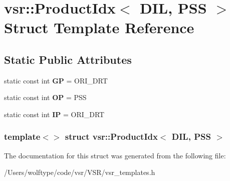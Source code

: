 \hypertarget{structvsr_1_1_product_idx_3_01_d_i_l_00_01_p_s_s_01_4}{\section{vsr\-:\-:Product\-Idx$<$ D\-I\-L, P\-S\-S $>$ Struct Template Reference}
\label{structvsr_1_1_product_idx_3_01_d_i_l_00_01_p_s_s_01_4}
}
\subsection*{Static Public Attributes}
\begin{DoxyCompactItemize}
\item 
\hypertarget{structvsr_1_1_product_idx_3_01_d_i_l_00_01_p_s_s_01_4_a7039547e4ee042e1df908ab828740db7}{static const int {\bfseries G\-P} = O\-R\-I\-\_\-\-D\-R\-T}\label{structvsr_1_1_product_idx_3_01_d_i_l_00_01_p_s_s_01_4_a7039547e4ee042e1df908ab828740db7}

\item 
\hypertarget{structvsr_1_1_product_idx_3_01_d_i_l_00_01_p_s_s_01_4_a1d242a09833b6c939d27c74488981d8b}{static const int {\bfseries O\-P} = P\-S\-S}\label{structvsr_1_1_product_idx_3_01_d_i_l_00_01_p_s_s_01_4_a1d242a09833b6c939d27c74488981d8b}

\item 
\hypertarget{structvsr_1_1_product_idx_3_01_d_i_l_00_01_p_s_s_01_4_a46f5932e666b2103cc11939a968644d1}{static const int {\bfseries I\-P} = O\-R\-I\-\_\-\-D\-R\-T}\label{structvsr_1_1_product_idx_3_01_d_i_l_00_01_p_s_s_01_4_a46f5932e666b2103cc11939a968644d1}

\end{DoxyCompactItemize}
\subsubsection*{template$<$$>$ struct vsr\-::\-Product\-Idx$<$ D\-I\-L, P\-S\-S $>$}



The documentation for this struct was generated from the following file\-:\begin{DoxyCompactItemize}
\item 
/\-Users/wolftype/code/vsr/\-V\-S\-R/vsr\-\_\-templates.\-h\end{DoxyCompactItemize}
